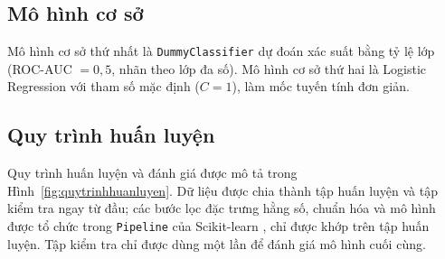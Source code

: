 \documentclass[12pt,a4paper,oneside]{report}
\begin{document}
\subsection{Mô hình cơ sở}
Mô hình cơ sở thứ nhất là \texttt{DummyClassifier} dự đoán xác suất bằng tỷ lệ
lớp (ROC-AUC $=0{,}5$, nhãn theo lớp đa số). Mô hình cơ sở thứ hai là Logistic
Regression với tham số mặc định ($C=1$), làm mốc tuyến tính đơn giản.

\subsection{Quy trình huấn luyện}

Quy trình huấn luyện và đánh giá được mô tả trong Hình~\ref{fig:quytrinhhuanluyen}.
Dữ liệu được chia thành tập huấn luyện và tập kiểm tra ngay từ đầu; các bước lọc
đặc trưng hằng số, chuẩn hóa và mô hình được tổ chức trong \texttt{Pipeline} của
Scikit-learn \cite{pedregosa2011}, chỉ được khớp trên tập huấn luyện. Tập kiểm tra chỉ được dùng một lần để đánh giá mô
hình cuối cùng.
\end{document}
